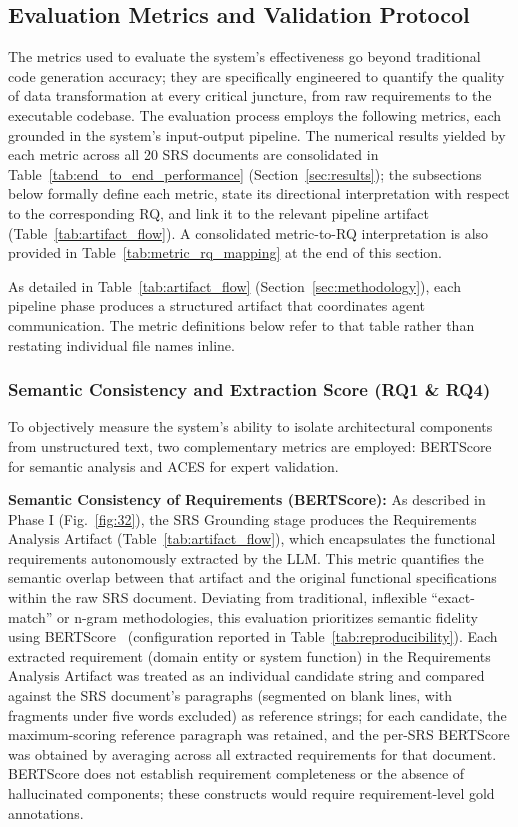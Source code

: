 \subsection{Evaluation Metrics and Validation Protocol}

The metrics used to evaluate the system's effectiveness go beyond traditional code generation accuracy; they are specifically engineered to quantify the quality of data transformation at every critical juncture, from raw requirements to the executable codebase. The evaluation process employs the following metrics, each grounded in the system's input-output pipeline. The numerical results yielded by each metric across all 20 SRS documents are consolidated in Table~\ref{tab:end_to_end_performance} (Section~\ref{sec:results}); the subsections below formally define each metric, state its directional interpretation with respect to the corresponding RQ, and link it to the relevant pipeline artifact (Table~\ref{tab:artifact_flow}). A consolidated metric-to-RQ interpretation is also provided in Table~\ref{tab:metric_rq_mapping} at the end of this section.

As detailed in Table~\ref{tab:artifact_flow} (Section~\ref{sec:methodology}), each pipeline phase produces a structured artifact that coordinates agent communication. The metric definitions below refer to that table rather than restating individual file names inline.

\subsubsection{Semantic Consistency and Extraction Score (RQ1 \& RQ4)}

To objectively measure the system's ability to isolate architectural components from unstructured text, two complementary metrics are employed: BERTScore for semantic analysis and ACES for expert validation.

\textbf{Semantic Consistency of Requirements (BERTScore):} As described in Phase I (Fig.~\ref{fig:32}), the SRS Grounding stage produces the Requirements Analysis Artifact (Table~\ref{tab:artifact_flow}), which encapsulates the functional requirements autonomously extracted by the LLM. This metric quantifies the semantic overlap between that artifact and the original functional specifications within the raw SRS document. Deviating from traditional, inflexible ``exact-match'' or n-gram methodologies, this evaluation prioritizes semantic fidelity using BERTScore~\citep{zhang2019bertscore} (configuration reported in Table~\ref{tab:reproducibility}). Each extracted requirement (domain entity or system function) in the Requirements Analysis Artifact was treated as an individual candidate string and compared against the SRS document's paragraphs (segmented on blank lines, with fragments under five words excluded) as reference strings; for each candidate, the maximum-scoring reference paragraph was retained, and the per-SRS BERTScore was obtained by averaging across all extracted requirements for that document. BERTScore does not establish requirement completeness or the absence of hallucinated components; these constructs would require requirement-level gold annotations.

